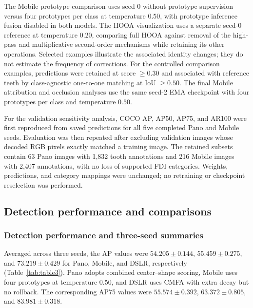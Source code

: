 \documentclass[a4paper,fleqn]{cas-dc}
\begin{document}
The Mobile prototype comparison uses seed 0 without prototype supervision versus four prototypes per class at temperature $0.50$, with prototype inference fusion disabled in both models. The HOOA visualization uses a separate seed-0 reference at temperature $0.20$, comparing full HOOA against removal of the high-pass and multiplicative second-order mechanisms while retaining its other operations. Selected examples illustrate the associated identity changes; they do not estimate the frequency of corrections. For the controlled comparison examples, predictions were retained at score $\geq0.30$ and associated with reference teeth by class-agnostic one-to-one matching at IoU $\geq0.50$. The final Mobile attribution and occlusion analyses use the same seed-2 EMA checkpoint with four prototypes per class and temperature $0.50$.

For the validation sensitivity analysis, COCO AP, AP50, AP75, and AR100 were first reproduced from saved predictions for all five completed Pano and Mobile seeds. Evaluation was then repeated after excluding validation images whose decoded RGB pixels exactly matched a training image. The retained subsets contain 63 Pano images with 1,832 tooth annotations and 216 Mobile images with 2,407 annotations, with no loss of supported FDI categories. Weights, predictions, and category mappings were unchanged; no retraining or checkpoint reselection was performed.

\subsection{Detection performance and comparisons}
\subsubsection{Detection performance and three-seed summaries}
Averaged across three seeds, the AP values were $54.205\pm0.144$, $55.459\pm0.275$, and $73.219\pm0.429$ for Pano, Mobile, and DSLR, respectively (Table~\ref{tab:table3}). Pano adopts combined center--shape scoring, Mobile uses four prototypes at temperature $0.50$, and DSLR uses CMFA with extra decay but no rollback. The corresponding AP75 values were $55.574\pm0.392$, $63.372\pm0.805$, and $83.981\pm0.318$.
\end{document}
